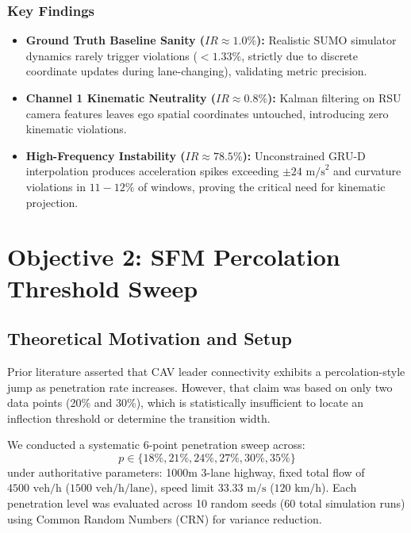 \documentclass[11pt,a4paper]{article}
\begin{document}
\subsubsection{Key Findings}
\begin{itemize}[leftmargin=1.5em, itemsep=2pt]
    \item \textbf{Ground Truth Baseline Sanity ($IR \approx 1.0\%$):} Realistic SUMO simulator dynamics rarely trigger violations ($< 1.33\%$, strictly due to discrete coordinate updates during lane-changing), validating metric precision.
    \item \textbf{Channel 1 Kinematic Neutrality ($IR \approx 0.8\%$):} Kalman filtering on RSU camera features leaves ego spatial coordinates untouched, introducing zero kinematic violations.
    \item \textbf{High-Frequency Instability ($IR \approx 78.5\%$):} Unconstrained GRU-D interpolation produces acceleration spikes exceeding $\pm 24\text{ m/s}^2$ and curvature violations in $11-12\%$ of windows, proving the critical need for kinematic projection.
\end{itemize}

\vspace{0.8em}

\section{Objective 2: SFM Percolation Threshold Sweep}

\subsection{Theoretical Motivation and Setup}
Prior literature asserted that CAV leader connectivity exhibits a percolation-style jump as penetration rate increases. However, that claim was based on only two data points (20\% and 30\%), which is statistically insufficient to locate an inflection threshold or determine the transition width.

We conducted a systematic 6-point penetration sweep across:
\begin{equation}
    p \in \{18\%, 21\%, 24\%, 27\%, 30\%, 35\%\}
\end{equation}
under authoritative parameters: 1000m 3-lane highway, fixed total flow of $4500\text{ veh/h}$ ($1500\text{ veh/h/lane}$), speed limit $33.33\text{ m/s}$ ($120\text{ km/h}$). Each penetration level was evaluated across 10 random seeds (60 total simulation runs) using Common Random Numbers (CRN) for variance reduction.
\end{document}
